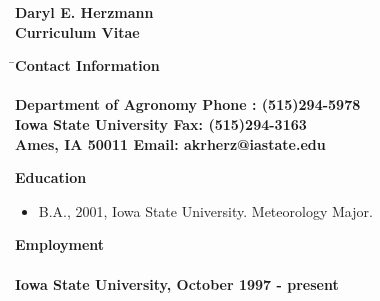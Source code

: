 \renewcommand{\oddsidemargin}{0pt}
\renewcommand{\evensidemargin}{0pt}
\renewcommand{\topmargin}{0pt}
\renewcommand{\headheight}{0pt}
\renewcommand{\headsep}{0pt}
\renewcommand{\textwidth}{468pt}
\renewcommand{\textheight}{260mm}
\hoffset=-60pt
\voffset=-36pt
%
\settowidth{\parindent}{}
\setlength{\parskip}{2mm}
%
\newcommand{\dvd}{\rule{30mm}{0.2mm}}
\newcommand{\beq}{\begin{equation}}
\newcommand{\beqn}{\begin{eqnarray}}
\newcommand{\eeq}{\end{equation}}
\newcommand{\eeqn}{\end{eqnarray}}
\newcommand{\lsf}{\large \sf}
%
\newcommand{\qbar}{\mbox{$\overline{q}$}}
%

%
\vspace*{0.25in}
\begin{center}
\LARGE \bf Daryl E. Herzmann\\
\Large \bf Curriculum Vitae\\
\end{center}
\begin{tabbing}
\= \Large \bf Contact Information \hspace*{2.5in} \= \\
\> \> \\
\> \lsf Department of Agronomy \> \lsf Phone : (515)294-5978\\
\> \lsf Iowa State University \> \lsf Fax: (515)294-3163\\
\> \lsf Ames, IA 50011 \> \lsf Email: akrherz@iastate.edu \\
\end{tabbing}
\Large \bf Education
\normalsize \sf
\begin{itemize}
\item B.A., 2001, Iowa State University.  Meteorology Major.
\end{itemize}
\Large \bf Employment\\ \\
\normalsize \bf Iowa State University, October 1997 - present
\normalsize \sf
